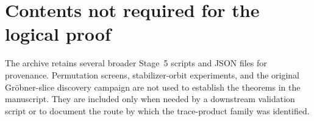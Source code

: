 \documentclass[pdflatex,sn-mathphys-num]{sn-jnl}
\begin{document}
\section{Contents not required for the logical proof}

The archive retains several broader Stage~5 scripts and JSON files for provenance.  Permutation screens, stabilizer-orbit experiments, and the original Gr\"obner-slice discovery campaign are not used to establish the theorems in the manuscript.  They are included only when needed by a downstream validation script or to document the route by which the trace-product family was identified.
\end{document}
